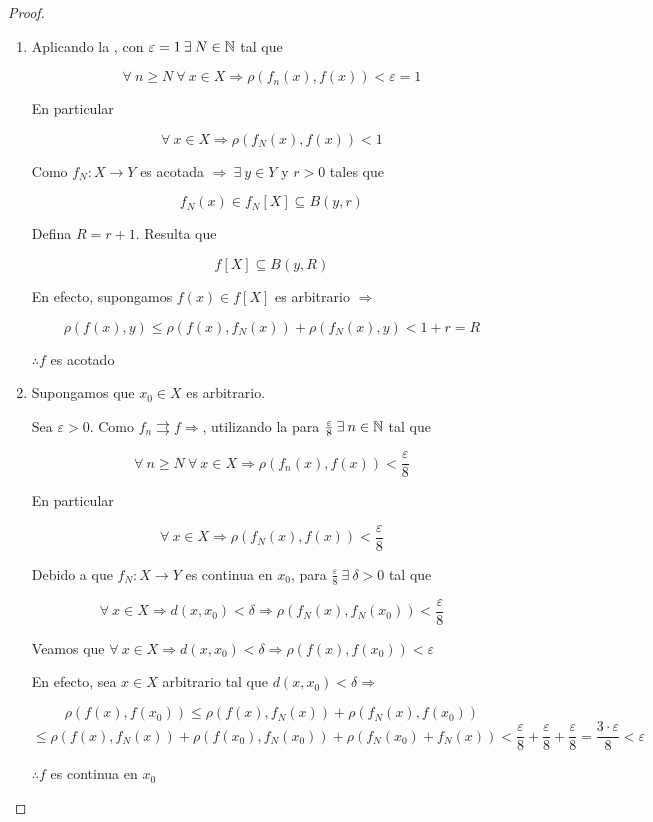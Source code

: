 \begin{proof}
\begin{enumerate}
    \item Aplicando la , con $\varepsilon = 1 \: \exists \: N \in \mathbb{N}$ tal que 

    $$\forall \: n \geqslant N \: \forall \: x \in X \Rightarrow \rho(f_n(x),f(x)) < \varepsilon = 1$$

    En particular

    $$\forall \: x \in X \Rightarrow \rho(f_N(x),f(x)) <  1$$

    Como $f_N : X \to Y$ es acotada $\Rightarrow \: \exists \: y \in Y$ y $r > 0$ tales que

    $$ f_N(x) \in f_N[X] \subseteq B(y,r)$$

    Defina $R = r +1$. Resulta que

    $$f[X] \subseteq B(y,R)$$

    En efecto, supongamos $f(x) \in f[X]$ es arbitrario $\Rightarrow$

    $$\rho(f(x), y) \leqslant \rho(f(x),f_N(x)) + \rho(f_N(x),y) < 1 + r = R$$

    $\therefore f$ es acotado

    \item Supongamos que $x_0 \in X$ es arbitrario. 

    Sea $\varepsilon > 0$. Como $f_n \rightrightarrows f \Rightarrow$, utilizando la  para $\frac{\varepsilon}{8} \: \exists \: n \in \mathbb{N}$ tal que 

    $$\forall \: n \geqslant N \: \forall \: x \in X \Rightarrow \rho(f_n(x),f(x)) < \frac{\varepsilon}{8}$$

    En particular 

    $$\forall \: x \in X \Rightarrow \rho(f_N(x),f(x)) <  \frac{\varepsilon}{8}$$

    Debido a que $f_N : X \to Y$ es continua en $x_0$, para $\frac{\varepsilon}{8} \: \exists \: \delta > 0$ tal que

    $$\forall \: x \in X \Rightarrow d(x,x_0) < \delta \Rightarrow \rho(f_N(x), f_N(x_0)) < \frac{\varepsilon}{8}$$ 

    Veamos que $\forall \: x \in X \Rightarrow d(x,x_0) < \delta \Rightarrow \rho(f(x),f(x_0)) < \varepsilon$

    En efecto, sea $x \in X$ arbitrario tal que $d(x,x_0) < \delta \Rightarrow$

    $$\rho(f(x),f(x_0)) \leqslant \rho(f(x),f_N(x)) + \rho(f_N(x), f(x_0))$$
    $$\leqslant \rho(f(x),f_N(x)) + \rho(f(x_0),f_N(x_0)) + \rho(f_N(x_0)+f_N(x)) < \frac{\varepsilon}{8} + \frac{\varepsilon}{8} + \frac{\varepsilon}{8} = \frac{3 \cdot \varepsilon}{8} < \varepsilon$$

    $\therefore f$ es continua en $x_0$
\end{enumerate}
\end{proof}


